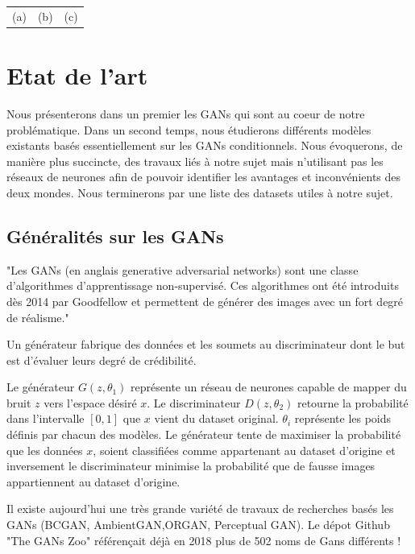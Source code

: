 \documentclass[a4paper, 12pt]{book}
\begin{document}
\begin{center}
\begin{tabular}{ccc}
    (a)&(b)&(c)
  \end{tabular}
\end{center}



\chapter{Etat de l'art}
 
Nous présenterons dans un premier les GANs qui sont au coeur de notre problématique. Dans un second temps, nous étudierons différents modèles existants basés essentiellement sur les GANs conditionnels. Nous évoquerons, de manière plus succincte, des travaux liés à notre sujet mais n'utilisant pas les réseaux de neurones afin de pouvoir identifier les avantages et inconvénients des deux mondes. Nous terminerons par une liste des datasets utiles à notre sujet.


\section{Généralités sur les GANs}

"Les GANs (en anglais generative adversarial networks) sont une classe d'algorithmes d'apprentissage non-supervisé. Ces algorithmes ont été introduits dès 2014 par Goodfellow et permettent de générer des images avec un fort degré de réalisme." \cite{wiki:Reseaux-antagonistes-generatifs}

Un générateur fabrique des données et les soumets au discriminateur dont le but est d'évaluer leurs degré de crédibilité. 

Le générateur $G(z, \theta_{1})$ représente un réseau de neurones capable de mapper du bruit $z$ vers l'espace désiré $x$. Le discriminateur $D(z, \theta_{2})$ retourne la probabilité dans l'intervalle $[0,1]$ que $x$ vient du dataset original. $\theta_{i}$ représente les poids définis par chacun des modèles. Le générateur tente de maximiser la probabilité que les données $x$, soient classifiées comme appartenant au dataset d'origine et inversement le discriminateur minimise la probabilité que de fausse images appartiennent au dataset d'origine.

Il existe aujourd'hui une très grande variété de travaux de recherches basés les GANs (BCGAN, AmbientGAN,ORGAN, Perceptual GAN). Le dépot Github "The GANs Zoo" \cite{hindupuravinash} référençait déjà en 2018 plus de 502 noms de Gans différents !
\end{document}
